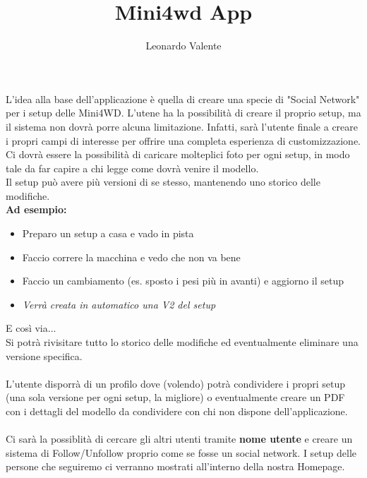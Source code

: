 \documentclass[12pt, a4paper]{article}
\author{Leonardo Valente}
\title{Mini4wd App}
\begin{document}
    \maketitle

    L'idea alla base dell'applicazione è quella di creare una specie di "Social Network"
    per i setup delle Mini4WD. L'utene ha la possibilità di creare il proprio setup, ma il sistema non dovrà
    porre alcuna limitazione. Infatti, sarà l'utente finale a creare i propri campi di interesse per offrire una
    completa esperienza di customizzazione.
    Ci dovrà essere la possibilità di caricare molteplici foto per ogni setup, in modo tale da far capire a chi legge 
    come dovrà venire il modello.
    \\Il setup può avere più versioni di se stesso, mantenendo uno storico delle modifiche. 
    \\ \textbf{Ad esempio:} 
    \begin{itemize}
        \item Preparo un setup a casa e vado in pista
        \item Faccio correre la macchina e vedo che non va bene
        \item Faccio un cambiamento (es. sposto i pesi più in avanti) e aggiorno il setup
        \item \textit{Verrà creata in automatico una V2 del setup}
    \end{itemize}
    E così via...
    \\
    Si potrà rivisitare tutto lo storico delle modifiche ed eventualmente eliminare una versione specifica.
    \\\\
    L'utente disporrà di un profilo dove (volendo) potrà condividere i propri setup (una sola versione per ogni setup, la migliore)
    o eventualmente creare un PDF con i dettagli del modello da condividere con chi non dispone dell'applicazione.
    \\\\
    Ci sarà la possiblità di cercare gli altri utenti tramite \textbf{nome utente} e creare un sistema di 
    Follow/Unfollow proprio come se fosse un social network. I setup delle persone che seguiremo ci verranno mostrati 
    all'interno della nostra Homepage.
\end{document}
